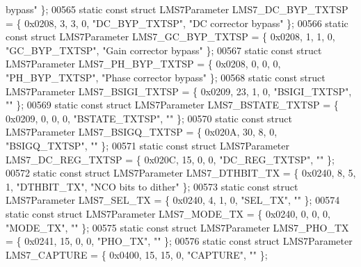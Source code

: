 \begin{DoxyCode}
{       bypass"} \};
00565 \textcolor{keyword}{static} \textcolor{keyword}{const} \textcolor{keyword}{struct }LMS7Parameter LMS7_DC_BYP_TXTSP = \{ 0x0208, 3, 3, 0, \textcolor{stringliteral}{"DC\_BYP\_TXTSP"}, \textcolor{stringliteral}{"DC corrector
       bypass"} \};
00566 \textcolor{keyword}{static} \textcolor{keyword}{const} \textcolor{keyword}{struct }LMS7Parameter LMS7_GC_BYP_TXTSP = \{ 0x0208, 1, 1, 0, \textcolor{stringliteral}{"GC\_BYP\_TXTSP"}, \textcolor{stringliteral}{"Gain corrector
       bypass"} \};
00567 \textcolor{keyword}{static} \textcolor{keyword}{const} \textcolor{keyword}{struct }LMS7Parameter LMS7_PH_BYP_TXTSP = \{ 0x0208, 0, 0, 0, \textcolor{stringliteral}{"PH\_BYP\_TXTSP"}, \textcolor{stringliteral}{"Phase corrector
       bypass"} \};
00568 \textcolor{keyword}{static} \textcolor{keyword}{const} \textcolor{keyword}{struct }LMS7Parameter LMS7_BSIGI_TXTSP = \{ 0x0209, 23, 1, 0, \textcolor{stringliteral}{"BSIGI\_TXTSP"}, \textcolor{stringliteral}{""} \};
00569 \textcolor{keyword}{static} \textcolor{keyword}{const} \textcolor{keyword}{struct }LMS7Parameter LMS7_BSTATE_TXTSP = \{ 0x0209, 0, 0, 0, \textcolor{stringliteral}{"BSTATE\_TXTSP"}, \textcolor{stringliteral}{""} \};
00570 \textcolor{keyword}{static} \textcolor{keyword}{const} \textcolor{keyword}{struct }LMS7Parameter LMS7_BSIGQ_TXTSP = \{ 0x020A, 30, 8, 0, \textcolor{stringliteral}{"BSIGQ\_TXTSP"}, \textcolor{stringliteral}{""} \};
00571 \textcolor{keyword}{static} \textcolor{keyword}{const} \textcolor{keyword}{struct }LMS7Parameter LMS7_DC_REG_TXTSP = \{ 0x020C, 15, 0, 0, \textcolor{stringliteral}{"DC\_REG\_TXTSP"}, \textcolor{stringliteral}{""} \};
00572 \textcolor{keyword}{static} \textcolor{keyword}{const} \textcolor{keyword}{struct }LMS7Parameter LMS7_DTHBIT_TX = \{ 0x0240, 8, 5, 1, \textcolor{stringliteral}{"DTHBIT\_TX"}, \textcolor{stringliteral}{"NCO bits to dither"} \};
00573 \textcolor{keyword}{static} \textcolor{keyword}{const} \textcolor{keyword}{struct }LMS7Parameter LMS7_SEL_TX = \{ 0x0240, 4, 1, 0, \textcolor{stringliteral}{"SEL\_TX"}, \textcolor{stringliteral}{""} \};
00574 \textcolor{keyword}{static} \textcolor{keyword}{const} \textcolor{keyword}{struct }LMS7Parameter LMS7_MODE_TX = \{ 0x0240, 0, 0, 0, \textcolor{stringliteral}{"MODE\_TX"}, \textcolor{stringliteral}{""} \};
00575 \textcolor{keyword}{static} \textcolor{keyword}{const} \textcolor{keyword}{struct }LMS7Parameter LMS7_PHO_TX = \{ 0x0241, 15, 0, 0, \textcolor{stringliteral}{"PHO\_TX"}, \textcolor{stringliteral}{""} \};
00576 \textcolor{keyword}{static} \textcolor{keyword}{const} \textcolor{keyword}{struct }LMS7Parameter LMS7_CAPTURE = \{ 0x0400, 15, 15, 0, \textcolor{stringliteral}{"CAPTURE"}, \textcolor{stringliteral}{""} \};

\end{DoxyCode}
